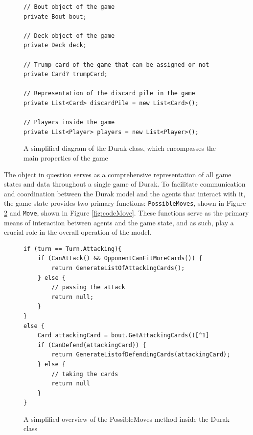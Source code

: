\begin{figure}[h]
\captionsetup{justification=centering}
\begin{lstlisting}
// Bout object of the game
private Bout bout;

// Deck object of the game
private Deck deck;

// Trump card of the game that can be assigned or not
private Card? trumpCard;

// Representation of the discard pile in the game
private List<Card> discardPile = new List<Card>();

// Players inside the game
private List<Player> players = new List<Player>();

\end{lstlisting}
\caption{A simplified diagram of the Durak class, which encompasses the main properties of the game}
\label{fig:codeDurak}
\end{figure}

The object in question serves as a comprehensive representation of all game states and data throughout a single game of Durak. To facilitate communication and coordination between the Durak model and the agents that interact with it, the game state provides two primary functions: \texttt{PossibleMoves}, shown in Figure \ref{fig:codePossibleMoves} and \texttt{Move}, shown in Figure \ref{fig:codeMove}. These functions serve as the primary means of interaction between agents and the game state, and as such, play a crucial role in the overall operation of the model. 

\begin{figure}[h]
\captionsetup{justification=centering}
\begin{lstlisting}
if (turn == Turn.Attacking){
    if (CanAttack() && OpponentCanFitMoreCards()) {
        return GenerateListOfAttackingCards();
    } else {
        // passing the attack
        return null;	
    }
}
else {
    Card attackingCard = bout.GetAttackingCards()[^1]
    if (CanDefend(attackingCard)) {
        return GenerateListofDefendingCards(attackingCard);
    } else {
        // taking the cards
        return null
    }
}
\end{lstlisting}
\caption{A simplified overview of the PossibleMoves method inside the Durak class}
\label{fig:codePossibleMoves}
\end{figure}

